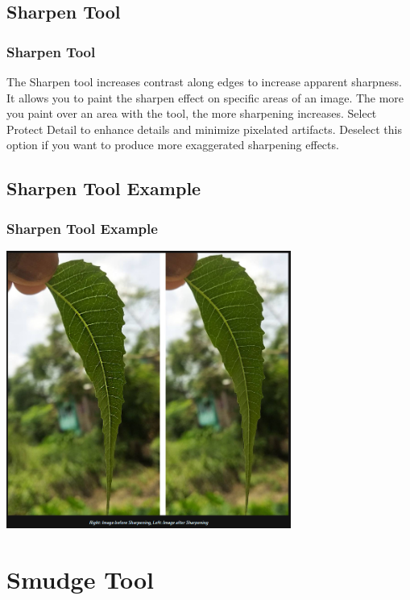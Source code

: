 \documentclass{beamer}
\begin{document}
			\subsection{Sharpen Tool}		
	\begin{frame}
		\frametitle{Sharpen Tool}
				\begin{outline}
					\1 The Sharpen tool increases contrast along edges to increase apparent sharpness. 
					\1 It allows you to paint the sharpen effect on specific areas of an image.
					\1 The more you paint over an area with the tool, the more sharpening increases.
					\1 Select Protect Detail to enhance details and minimize pixelated artifacts. 
					\2 Deselect this option if you want to produce more exaggerated sharpening effects.
				\end{outline}
		\end{frame}
	
				\subsection{Sharpen Tool Example}		
	\begin{frame}
		\frametitle{Sharpen Tool Example}

		\includegraphics[width=0.7\textwidth]{images/sharpen tool example.png}
	\end{frame}
			
		\section{Smudge Tool}
\end{document}
